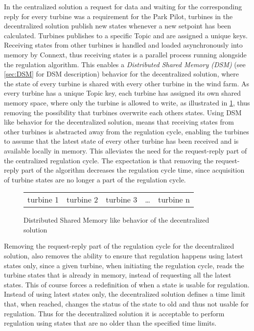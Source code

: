 In the centralized solution a request for data and waiting for the corresponding reply for every turbine was a requirement for the Park Pilot, turbines in the decentralized solution publish new states whenever a new setpoint has been calculated. Turbines publishes to a specific Topic and are assigned a unique keys. Receiving states from other turbines is handled and loaded asynchronously into memory by Connext, thus receiving states is a parallel process running alongside the regulation algorithm.
This enables a \textit{Distributed Shared Memory (DSM)} (see \cref{sec:DSM} for DSM description) behavior for the decentralized solution, where the state of every turbine is shared with every other turbine in the wind farm.
As every turbine has a unique Topic key, each turbine has assigned its own shared memory space, where only the turbine is allowed to write, as illustrated in \cref{fig:DSMlikeBehavior}, thus removing the possibility that turbines overwrite each others states. Using DSM like behavior for the decentralized solution, means that receiving states from other turbines is abstracted away from the regulation cycle, enabling the turbines to assume that the latest state of every other turbine has been received and is available locally in memory. This alleviates the need for the request-reply part of the centralized regulation cycle. The expectation is that removing the request-reply part of the algorithm decreases the regulation cycle time, since acquisition of turbine states are no longer a part of the regulation cycle.  

\begin{figure}[!h]
	\begin{tabular}{ | c | c | c | c | c |}
		\cline{1-3}
		\cline{5-5}
		turbine 1 & turbine 2 & turbine 3 & \dots & turbine n \\
		\cline{1-3}
		\cline{5-5}
	\end{tabular}
	\caption{Distributed Shared Memory like behavior of the decentralized solution}
	\label{fig:DSMlikeBehavior}
\end{figure}

Removing the request-reply part of the regulation cycle for the decentralized solution, also removes the ability to ensure that regulation happens using latest states only, since a given turbine, when initiating the regulation cycle, reads the turbine states that is already in memory, instead of requesting all the latest states. This of course forces a redefinition of when a state is usable for regulation. Instead of using latest states only, the decentralized solution defines a time limit that, when reached, changes the status of the state to old and thus not usable for regulation. Thus for the decentralized solution it is acceptable to perform regulation using states that are no older than the specified time limits. 

